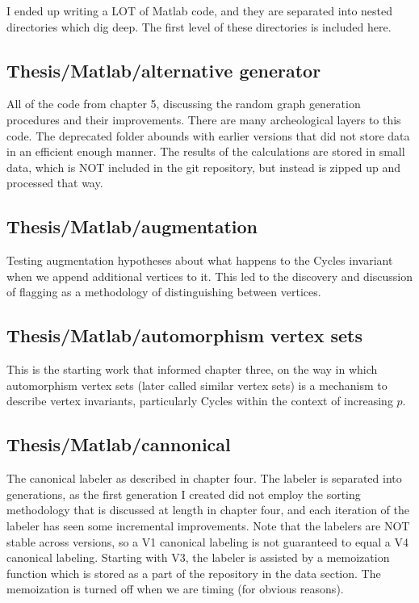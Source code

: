 I ended up writing a LOT of Matlab code, and they are separated into nested directories which dig deep.
The first level of these directories is included here.

\subsection*{Thesis/Matlab/alternative generator}

All of the code from chapter 5, discussing the random graph generation procedures and their improvements.
There are many archeological layers to this code.
The deprecated folder abounds with earlier versions that did not store data in an efficient enough manner.
The results of the calculations are stored in small data, which is NOT included in the git repository, but instead is zipped up and processed that way.

\subsection*{Thesis/Matlab/augmentation}

Testing augmentation hypotheses about what happens to the Cycles invariant when we append additional vertices to it.
This led to the discovery and discussion of flagging as a methodology of distinguishing between vertices.

\subsection*{Thesis/Matlab/automorphism vertex sets}

This is the starting work that informed chapter three, on the way in which automorphism vertex sets (later called similar vertex sets) is a mechanism to describe vertex invariants, particularly Cycles within the context of increasing $p$.

\subsection*{Thesis/Matlab/cannonical}

The canonical labeler as described in chapter four.  
The labeler is separated into generations, as the first generation I created did not employ the sorting methodology that is discussed at length in chapter four, and each iteration of the labeler has seen some incremental improvements.
Note that the labelers are NOT stable across versions, so a V1 canonical labeling is not guaranteed to equal a V4 canonical labeling. 
Starting with V3, the labeler is assisted by a memoization function which is stored as a part of the repository in the data section. 
The memoization is turned off when we are timing (for obvious reasons).

